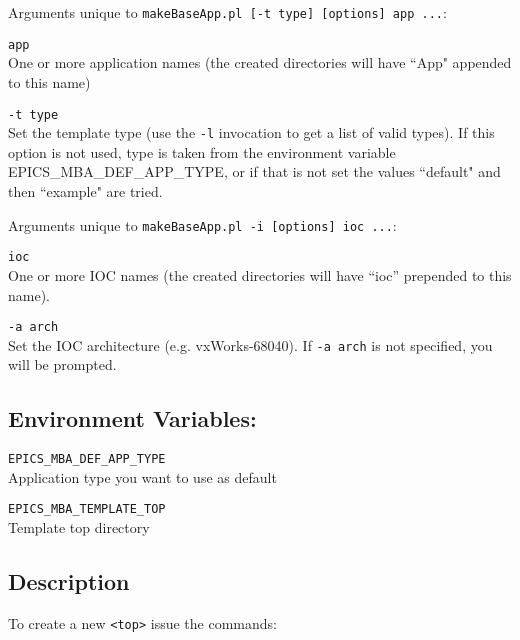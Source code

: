 Arguments unique to \verb|makeBaseApp.pl [-t type] [options] app ...|:

\begin{description}
\item \verb|app| \\
One or more application names (the created directories will have ``App" appended to this name)

\item \verb|-t type| \\
Set the template type (use the \verb|-l| invocation to get a list of valid types).
If this option is not used, type is taken from the environment variable EPICS\_MBA\_DEF\_APP\_TYPE, or if that is not set the values ``default" and then ``example" are tried.
\end{description}

Arguments unique to \verb|makeBaseApp.pl -i [options] ioc ...|:

\begin{description}
\item \verb|ioc| \\
One or more IOC names (the created directories will have ``ioc'' prepended to this name).

\item \verb|-a arch| \\
Set the IOC architecture (e.g. vxWorks-68040).
If \verb|-a arch| is not specified, you will be prompted.
\end{description}

\subsection{Environment Variables:}

\begin{description}
\item \verb|EPICS_MBA_DEF_APP_TYPE| \\
Application type you want to use as default

\item \verb|EPICS_MBA_TEMPLATE_TOP| \\
Template top directory
\end{description}

\subsection{Description}

To create a new \verb|<top>| issue the commands:

